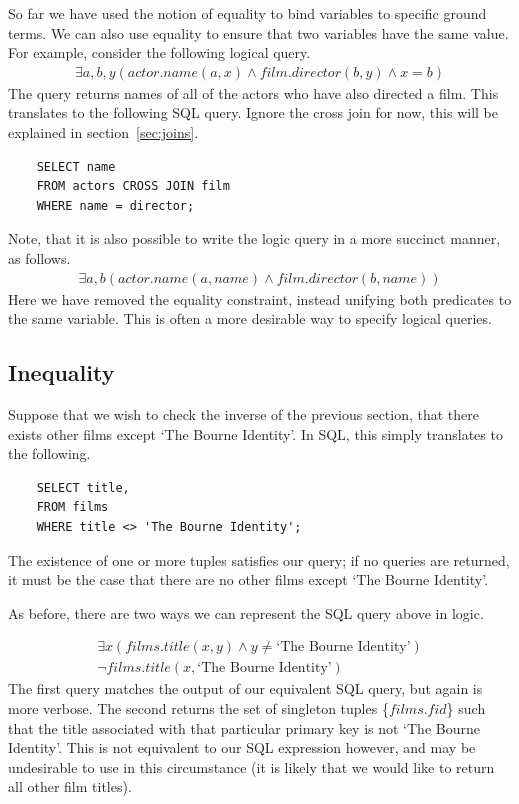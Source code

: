 \documentclass[a4paper, 11pt]{article}
\begin{document}
    So far we have used the notion of equality to bind variables to specific
    ground terms. We can also use equality to ensure that two variables have
    the same value. For example, consider the following logical query.
    \begin{gather}
      \exists a,b,y(actor.name(a, x) \land film.director(b, y) \land x = b)
    \end{gather}
    The query returns names of all of the actors who have also directed a
    film. This translates to the following SQL query. Ignore the cross join
    for now, this will be explained in section~\ref{sec:joins}.
    \begin{verbatim}
    SELECT name
    FROM actors CROSS JOIN film
    WHERE name = director;
    \end{verbatim}
    Note, that it is also possible to write the logic query in a more succinct
    manner, as follows.
    \begin{gather}
      \exists a,b(actor.name(a, name) \land film.director(b, name))
    \end{gather}
    Here we have removed the equality constraint, instead unifying both
    predicates to the same variable. This is often a more desirable way to
    specify logical queries.

  \subsection{Inequality}
    Suppose that we wish to check the inverse of the previous section, that
    there exists other films except `The Bourne Identity'. In SQL, this
    simply translates to the following.
    \begin{verbatim}
    SELECT title,
    FROM films
    WHERE title <> 'The Bourne Identity';
    \end{verbatim}
    The existence of one or more tuples satisfies our query; if no queries
    are returned, it must be the case that there are no other films except
    `The Bourne Identity'.

    As before, there are two ways we can represent the SQL query above in
    logic.

    \begin{gather}
      \exists x(films.title(x, y) \land y \neq \text{`The Bourne
      Identity'})\label{where3}\\
      \lnot films.title(x, \text{`The Bourne Identity'})\label{where4}
    \end{gather}
    The first query matches the output of our equivalent SQL query, but again
    is more verbose. The second returns the set of singleton tuples
    \{$films.fid$\} such that the title associated with that particular
    primary key is not `The Bourne Identity'. This is not equivalent to our
    SQL expression however, and may be undesirable to use in this
    circumstance (it is likely that we would like to return all other film
    titles).
\end{document}
